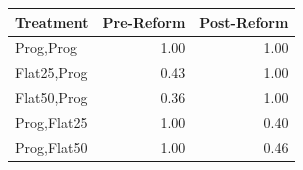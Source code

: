 \begin{tabular}{lrr}
\toprule
Treatment & Pre-Reform & Post-Reform \\
\midrule
Prog,Prog & 1.00 & 1.00 \\
Flat25,Prog & 0.43 & 1.00 \\
Flat50,Prog & 0.36 & 1.00 \\
Prog,Flat25 & 1.00 & 0.40 \\
Prog,Flat50 & 1.00 & 0.46 \\
\bottomrule
\end{tabular}
